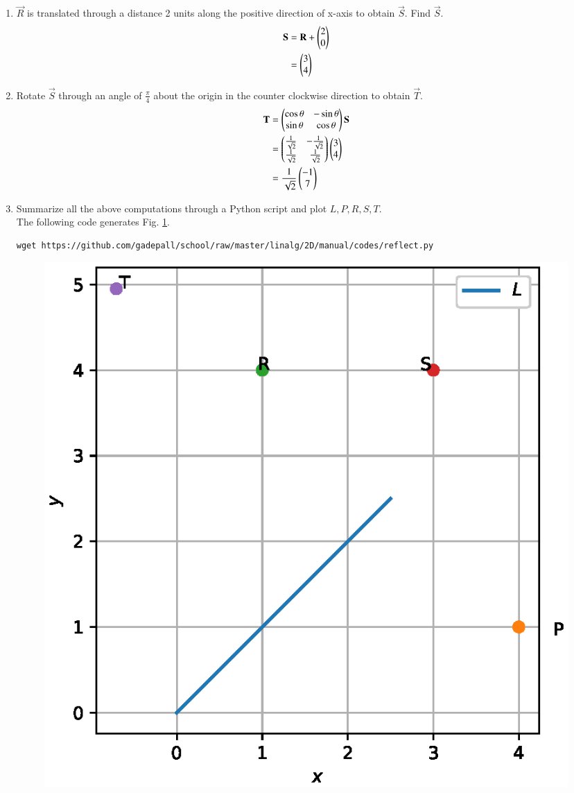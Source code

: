 \documentclass[journal,12pt,twocolumn]{IEEEtran}
\renewcommand\thesection{\arabic{section}}
\begin{document}
\begin{enumerate}[label=\thesection.\arabic*
,ref=\thesection.\theenumi]
\item   $\vec{R}$ is translated through a distance 2 units along the positive direction of x-axis to obtain
$\vec{S}$.  Find $\vec{S}$.
\\
\solution 
\begin{align}
\mathbf{S} &= \mathbf{R}+\begin{pmatrix}2 \\ 0\end{pmatrix}
\\
&= \begin{pmatrix}3 \\ 4\end{pmatrix}
\end{align}
\item Rotate $\vec{S}$ through an angle of  $ \frac{\pi}{4} $  about the origin in the counter clockwise 
direction to obtain $\vec{T}$.
\\
\solution 
\begin{align}
\label{eq:rotate}
\mathbf{T} &= \begin{pmatrix}\cos \theta &- \sin \theta \\ \sin \theta & \cos \theta\end{pmatrix} \mathbf{S}
\\
&= \begin{pmatrix}\frac{1}{\sqrt{2}} & -\frac{1}{\sqrt{2}} \\ \frac{1}{\sqrt{2}} & \frac{1}{\sqrt{2}}\end{pmatrix} \begin{pmatrix}3 \\ 4\end{pmatrix}
\\
&=  \frac{1}{\sqrt{2}}\begin{pmatrix}-1 \\ 7\end{pmatrix}
\end{align}
\item Summarize all the above computations through a Python script and plot $L, P, R, S, T$.
\\
\solution The following code generates Fig. \ref{fig:reflection}.
\begin{lstlisting}
wget https://github.com/gadepall/school/raw/master/linalg/2D/manual/codes/reflect.py
\end{lstlisting}
\begin{figure}
\centering
\includegraphics[width=\columnwidth]{./figs/reflection.eps}
\caption{}
\label{fig:reflection}
\end{figure}


\end{enumerate}
\end{document}
